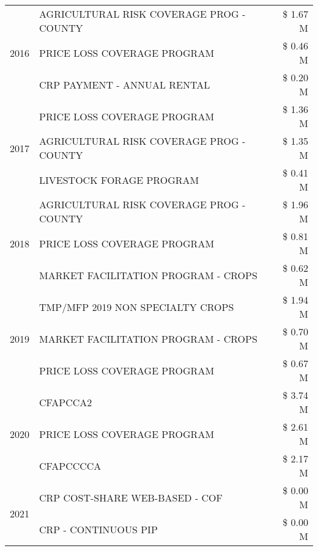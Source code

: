 \begin{tabular}{llr}
\cline{1-3}
\multirow[t]{3}{*}{2016} & AGRICULTURAL RISK COVERAGE PROG - COUNTY & \$ 1.67 M \\
 & PRICE LOSS COVERAGE PROGRAM & \$ 0.46 M \\
 & CRP PAYMENT - ANNUAL RENTAL & \$ 0.20 M \\
\cline{1-3}
\multirow[t]{3}{*}{2017} & PRICE LOSS COVERAGE PROGRAM & \$ 1.36 M \\
 & AGRICULTURAL RISK COVERAGE PROG - COUNTY & \$ 1.35 M \\
 & LIVESTOCK FORAGE PROGRAM & \$ 0.41 M \\
\cline{1-3}
\multirow[t]{3}{*}{2018} & AGRICULTURAL RISK COVERAGE PROG - COUNTY & \$ 1.96 M \\
 & PRICE LOSS COVERAGE PROGRAM & \$ 0.81 M \\
 & MARKET FACILITATION PROGRAM - CROPS & \$ 0.62 M \\
\cline{1-3}
\multirow[t]{3}{*}{2019} & TMP/MFP 2019 NON SPECIALTY CROPS & \$ 1.94 M \\
 & MARKET FACILITATION PROGRAM - CROPS & \$ 0.70 M \\
 & PRICE LOSS COVERAGE PROGRAM & \$ 0.67 M \\
\cline{1-3}
\multirow[t]{3}{*}{2020} & CFAPCCA2 & \$ 3.74 M \\
 & PRICE LOSS COVERAGE PROGRAM & \$ 2.61 M \\
 & CFAPCCCCA & \$ 2.17 M \\
\cline{1-3}
\multirow[t]{2}{*}{2021} & CRP COST-SHARE WEB-BASED - COF & \$ 0.00 M \\
 & CRP - CONTINUOUS PIP & \$ 0.00 M \\
\cline{1-3}
\bottomrule
\end{tabular}
